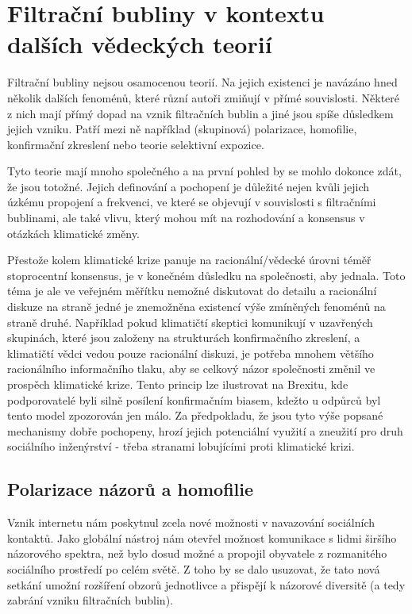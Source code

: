 \chapter{Filtrační bubliny v kontextu dalších vědeckých teorií}
\label{chapter:filtracni-bubliny-v-kontextu}
    Filtrační bubliny nejsou osamocenou teorií. Na jejich existenci je navázá\-no hned několik dalších fenoménů, které různí autoři zmiňují v přímé souvislosti. Některé z nich mají přímý dopad na vznik filtračních bublin a jiné jsou spíše důsledkem jejich vzniku. Patří mezi ně například (skupinová) polarizace, homofilie, konfirmační zkreslení nebo teorie selektivní expozice.~\citep{Sunstein07, Bruns, Pariser2011, messing, Foth} 
    
    Tyto teorie mají mnoho společného a na první pohled by se mohlo dokonce zdát, že jsou totožné. Jejich definování a pochopení je důležité nejen kvůli jejich úzkému propojení a frekvenci, ve které se objevují v souvislosti s filtračními bublinami, ale také vlivu, který mohou mít na rozhodování a konsensus v otázkách klimatické změny.
    
    Přestože kolem klimatické krize panuje na racionální/vědecké úrovni téměř stoprocentní konsensus, je v konečném důsledku na společnosti, aby jednala. Toto téma je ale ve veřejném měřítku nemožné diskutovat do detailu a racionální diskuze na straně jedné je znemožněna existencí výše zmíněných fenoménů na straně druhé. Například pokud klimatičtí skeptici komunikují v uzavřených skupinách, které jsou založeny na strukturách konfirmačního zkreslení, a klimatičtí vědci vedou pouze racionální diskuzi, je potřeba mnohem většího racionálního informačního tlaku, aby se celkový názor společnosti změnil ve prospěch klimatické krize. Tento princip lze ilustrovat na Brexitu, kde podporovatelé byli silně posílení konfirmačním biasem, kdežto u odpůrců byl tento model zpozorován jen málo. Za předpokladu, že jsou tyto výše popsané mechanismy dobře pochopeny, hrozí jejich potenciální využití a zneužití pro druh sociálního inženýrství - třeba stranami lobujícími proti klimatické krizi.~\citep{muller2020filter}


\section{Polarizace názorů a homofilie}
\label{sec:polarizace-homifilie}
    Vznik internetu nám poskytnul zcela nové možnosti v navazování sociálních kontaktů. Jako globální nástroj nám otevřel možnost komunikace s lidmi širšího názorového spektra, než bylo dosud možné a propojil obyvatele z rozmanitého sociálního prostředí po celém světě. Z toho by se dalo usuzovat, že tato nová setkání umožní rozšíření obzorů jednotlivce a přispějí k názorové diversitě (a tedy zabrání vzniku filtračních bublin).~\citep{Davies} 
    
